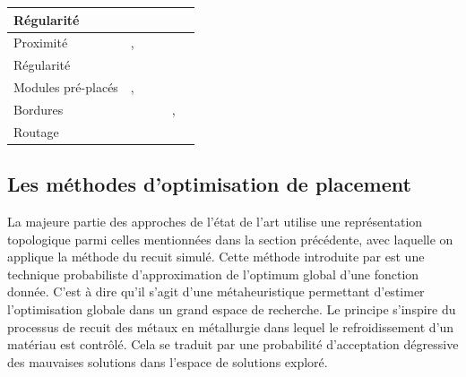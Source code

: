 \begin{table}[h]
\begin{tabular}{|L{100pt}|C{50pt}|C{50pt}|C{50pt}|C{50pt}|C{50pt}|}
    Régularité                                &                                                                      &\cite{Nakatake2010}&        &  \cite{Chou2011}&     \\ \hline
    Proximité                                 & \cite{Abthoff1996}, \cite{Young2000}                                 &\cite{Cheong2006}&        & \cite{Strasser08} &     \\ \hline
    Régularité                                &                                                                      &               &        & \cite{Balasa2000.2} &     \\ \hline
    Modules pré-placés                        & \cite{Abthoff1996}, \cite{Young1998}                                 &               &        & \cite{Tsao2011}     &     \\ \hline
    Bordures                                  & \cite{Young1999}                                                     &               &        & \cite{Lin2010}, \cite{Tsao2011}      &     \\ \hline
    Routage                                   & \cite{Prieto1997}                                                    &\cite{Xiao10}  &        &                     &     \\ \hline
  \end{tabular}
\end{table} \newpage

\subsection{Les méthodes d'optimisation de placement}
\label{sec:Placement-SoA-optimization}
La majeure partie des approches de l'état de l'art utilise une représentation topologique parmi celles mentionnées dans la section précédente, avec laquelle on applique la méthode du recuit simulé. Cette méthode introduite par \cite{kirkpatrick83} est une technique probabiliste d'approximation de l'optimum global d'une fonction donnée. C'est à dire qu'il s'agit d'une métaheuristique permettant d'estimer l'optimisation globale dans un grand espace de recherche. Le principe s'inspire du processus de recuit des métaux en métallurgie dans lequel le refroidissement d'un matériau est contrôlé. Cela se traduit par une probabilité d'acceptation dégressive des mauvaises solutions dans l'espace de solutions exploré. \newline

